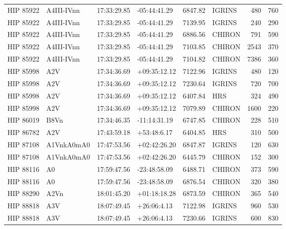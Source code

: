 \documentclass{emulateapj}
\begin{document}
\begin{longtable*}{|l|lllrlrr|}
   HIP 85922 &     A4III-IVnn &    17:33:29.85 &   -05:44:41.29 &  6847.82 &     IGRINS &      480 &     760 \\
   HIP 85922 &     A4III-IVnn &    17:33:29.85 &   -05:44:41.29 &  7139.95 &     IGRINS &      240 &     290 \\
   HIP 85922 &     A4III-IVnn &    17:33:29.85 &   -05:44:41.29 &  6886.56 &     CHIRON &      791 &     590 \\
   HIP 85922 &     A4III-IVnn &    17:33:29.85 &   -05:44:41.29 &  7103.85 &     CHIRON &     2543 &     370 \\
   HIP 85922 &     A4III-IVnn &    17:33:29.85 &   -05:44:41.29 &  7104.82 &     CHIRON &     7386 &     360 \\
   HIP 85998 &            A2V &    17:34:36.69 &   +09:35:12.12 &  7122.96 &     IGRINS &      480 &     120 \\
   HIP 85998 &            A2V &    17:34:36.69 &   +09:35:12.12 &  7230.64 &     IGRINS &      720 &     700 \\
   HIP 85998 &            A2V &    17:34:36.69 &   +09:35:12.12 &  6407.84 &        HRS &      324 &     490 \\
   HIP 85998 &            A2V &    17:34:36.69 &   +09:35:12.12 &  7079.89 &     CHIRON &     1600 &     220 \\
   HIP 86019 &           B8Vn &    17:34:46.35 &   -11:14:31.19 &  6747.85 &     CHIRON &      228 &     510 \\
   HIP 86782 &            A2V &    17:43:59.18 &    +53:48:6.17 &  6404.85 &        HRS &      310 &     500 \\
   HIP 87108 &     A1VnkA0mA0 &    17:47:53.56 &   +02:42:26.20 &  6847.87 &     IGRINS &      120 &     630 \\
   HIP 87108 &     A1VnkA0mA0 &    17:47:53.56 &   +02:42:26.20 &  6445.79 &     CHIRON &      152 &     300 \\
   HIP 88116 &             A0 &    17:59:47.56 &   -23:48:58.09 &  6488.71 &     CHIRON &      373 &     590 \\
   HIP 88116 &             A0 &    17:59:47.56 &   -23:48:58.09 &  6876.54 &     CHIRON &      320 &     380 \\
   HIP 88290 &           A2Vn &    18:01:45.20 &   +01:18:18.28 &  6873.59 &     CHIRON &      365 &     540 \\
   HIP 88818 &            A3V &    18:07:49.45 &    +26:06:4.13 &  7122.98 &     IGRINS &      960 &     530 \\
   HIP 88818 &            A3V &    18:07:49.45 &    +26:06:4.13 &  7230.66 &     IGRINS &      600 &     830 \\

\end{longtable*}
\end{document}
